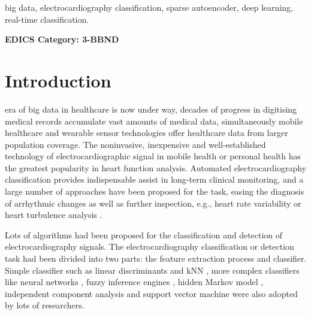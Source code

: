 \documentclass[journal]{IEEEtran}
\begin{document}
\begin{IEEEkeywords}
big data, electrocardiography classification, sparse autoencoder, deep learning, real-time classification.
\end{IEEEkeywords}

 \ifCLASSOPTIONpeerreview
 \begin{center} \bfseries EDICS Category: 3-BBND \end{center}
 \fi
%
\IEEEpeerreviewmaketitle



\section{Introduction}
% 
% 
% 
% 
 era of big data in healthcare is now under way, decades of progress in digitising medical records accumulate vast amounts of medical data, simultaneously mobile healthcare and wearable sensor technologies offer healthcare data from larger population coverage.
The noninvasive, inexpensive and well-established technology of electrocardiographic signal in mobile health or personal health has the greatest popularity in heart function analysis.
Automated electrocardiography classification provides indispensable assist in long-term clinical monitoring, and a large number of approaches have been proposed for the task, easing the diagnosis of arrhythmic changes as well as further inspection, e.g., heart rate variability or heart turbulence analysis \cite{mar}. 

Lots of algorithms had been proposed for the classification and detection of electrocardiography signals. 
The electrocardiography classification or detection task had been divided into two parts: the feature extraction process and classifier. 
Simple classifier such as linear discriminants \cite{chaza} and kNN \cite{melgan}, more complex classifiers like neural networks \cite{jiang, olmez, lin, osowski}, fuzzy inference engines \cite{osowski, kundu}, hidden Markov model \cite{andreao, coast}, independent component analysis \cite{zhu} and support vector machine  \cite{melgan, kampoura, khandoker} were also adopted by lots of researchers.  
\end{document}
